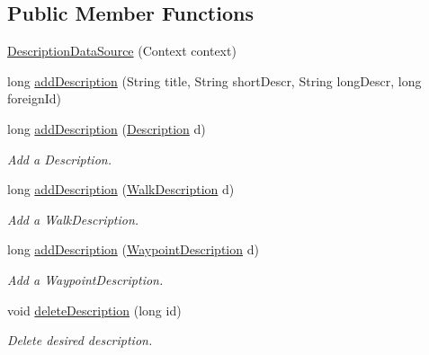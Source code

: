 \subsection*{Public Member Functions}
\begin{DoxyCompactItemize}
\item 
\hyperlink{classuk_1_1ac_1_1swan_1_1digitaltrails_1_1database_1_1_description_data_source_a38ab06958fd70330e566d3883f4bf130}{Description\+Data\+Source} (Context context)
\item 
long \hyperlink{classuk_1_1ac_1_1swan_1_1digitaltrails_1_1database_1_1_description_data_source_aefe52e0afdee53f7a300c48e19299ecc}{add\+Description} (String title, String short\+Descr, String long\+Descr, long foreign\+Id)
\item 
long \hyperlink{classuk_1_1ac_1_1swan_1_1digitaltrails_1_1database_1_1_description_data_source_a523009d78ef9c5f1144f41908da8b35e}{add\+Description} (\hyperlink{classuk_1_1ac_1_1swan_1_1digitaltrails_1_1components_1_1_description}{Description} d)
\begin{DoxyCompactList}\small\item\em Add a Description. \end{DoxyCompactList}\item 
long \hyperlink{classuk_1_1ac_1_1swan_1_1digitaltrails_1_1database_1_1_description_data_source_aed125b32a571fdd698630a23c268014e}{add\+Description} (\hyperlink{classuk_1_1ac_1_1swan_1_1digitaltrails_1_1components_1_1_walk_description}{Walk\+Description} d)
\begin{DoxyCompactList}\small\item\em Add a Walk\+Description. \end{DoxyCompactList}\item 
long \hyperlink{classuk_1_1ac_1_1swan_1_1digitaltrails_1_1database_1_1_description_data_source_a98a11820f32487aa46ae29aea11cecd2}{add\+Description} (\hyperlink{classuk_1_1ac_1_1swan_1_1digitaltrails_1_1components_1_1_waypoint_description}{Waypoint\+Description} d)
\begin{DoxyCompactList}\small\item\em Add a Waypoint\+Description. \end{DoxyCompactList}\item 
void \hyperlink{classuk_1_1ac_1_1swan_1_1digitaltrails_1_1database_1_1_description_data_source_af0c27ec463f89e831d2e8a0d4550cc1d}{delete\+Description} (long id)
\begin{DoxyCompactList}\small\item\em Delete desired description. \end{DoxyCompactList}\item 

\end{DoxyCompactItemize}
